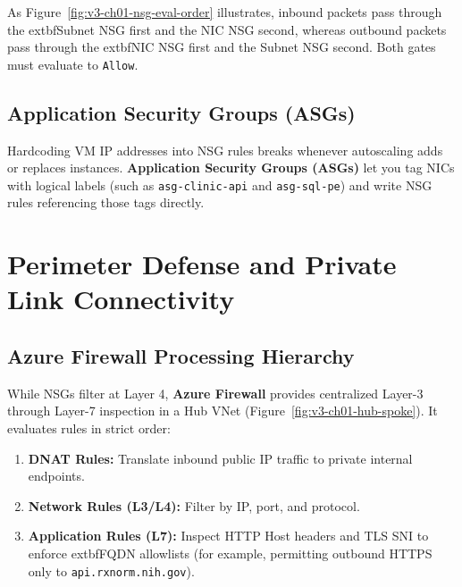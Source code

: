 As Figure~\ref{fig:v3-ch01-nsg-eval-order} illustrates, inbound packets pass through the 	extbf{Subnet NSG first and the NIC NSG second}, whereas outbound packets pass through the 	extbf{NIC NSG first and the Subnet NSG second}. Both gates must evaluate to \texttt{Allow}.

\subsection{Application Security Groups (ASGs)}
Hardcoding VM IP addresses into NSG rules breaks whenever autoscaling adds or replaces instances. \textbf{Application Security Groups (ASGs)} let you tag NICs with logical labels (such as \texttt{asg-clinic-api} and \texttt{asg-sql-pe}) and write NSG rules referencing those tags directly.

\section{Perimeter Defense and Private Link Connectivity}

\subsection{Azure Firewall Processing Hierarchy}
While NSGs filter at Layer 4, \textbf{Azure Firewall} provides centralized Layer-3 through Layer-7 inspection in a Hub VNet (Figure~\ref{fig:v3-ch01-hub-spoke}). It evaluates rules in strict order:
\begin{enumerate}[leftmargin=15pt]
  \item \textbf{DNAT Rules:} Translate inbound public IP traffic to private internal endpoints.
  \item \textbf{Network Rules (L3/L4):} Filter by IP, port, and protocol.
  \item \textbf{Application Rules (L7):} Inspect HTTP Host headers and TLS SNI to enforce 	extbf{FQDN allowlists} (for example, permitting outbound HTTPS only to \texttt{api.rxnorm.nih.gov}).
\end{enumerate}

